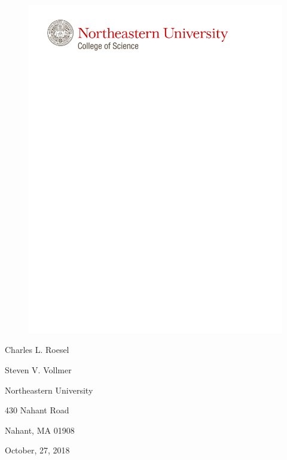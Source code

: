 \documentclass[12pt,portrait]{article}
\title{}
\author{}
\date{}
\begin{document}
\begin{figure}
    \advance\leftskip-1.5cm
    \vspace{-2cm}
    \includegraphics[width=\paperwidth]{NU_COS_ELetterhead_2013.pdf}
\end{figure}
\singlespacing
\begin{flushright}
Charles L. Roesel
\end{flushright}
\begin{flushright}
Steven V. Vollmer
\end{flushright}
\begin{flushright}
Northeastern University
\end{flushright}
\begin{flushright}
430 Nahant Road
\end{flushright}
\begin{flushright}
Nahant, MA 01908  
\end{flushright}

October, 27, 2018
\end{document}
